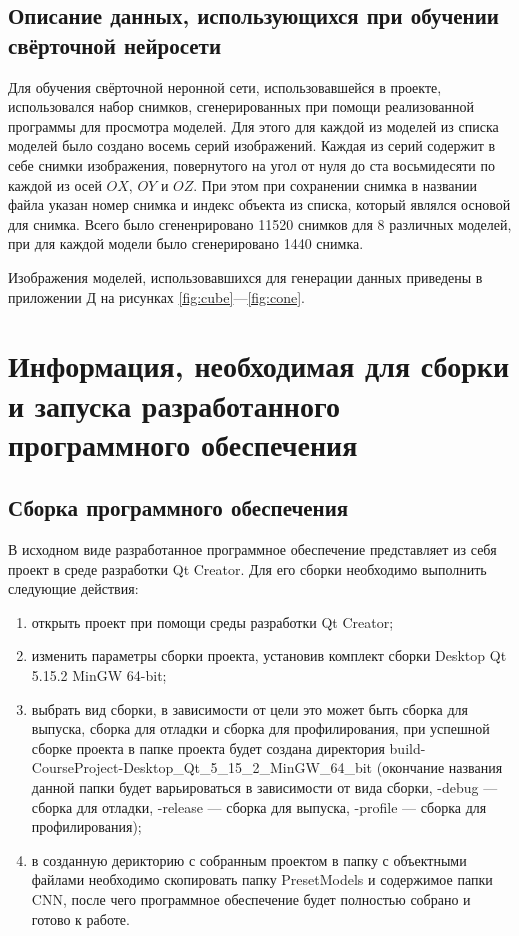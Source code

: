 \subsection{Описание данных, использующихся при обучении свёрточной нейросети}
Для обучения свёрточной неронной сети, использовавшейся в проекте, использовался набор снимков, сгенерированных при помощи реализованной программы для просмотра моделей. Для этого для каждой из моделей из списка моделей было создано восемь серий изображений. Каждая из серий содержит в себе снимки изображения, повернутого на угол от нуля до ста восьмидесяти по каждой из осей $OX$, $OY$ и $OZ$. При этом при сохранении снимка в названии файла указан номер снимка и индекс объекта из списка, который являлся основой для снимка. Всего было сгененрировано 11520 снимков для 8 различных моделей, при для каждой модели было сгенерировано 1440 снимка.

Изображения моделей, использовавшихся для генерации данных приведены в приложении Д на рисунках \ref{fig:cube}---\ref{fig:cone}.

\section{Информация, необходимая для сборки и запуска разработанного программного обеспечения}
\subsection{Сборка программного обеспечения}
В исходном виде разработанное программное обеспечение представляет из себя проект в среде разработки Qt Creator. Для его сборки необходимо выполнить следующие действия:
\begin{enumerate}
\item открыть проект при помощи среды разработки Qt Creator;
\item изменить параметры сборки проекта, установив комплект сборки Desktop Qt 5.15.2 MinGW 64-bit;
\item выбрать вид сборки, в зависимости от цели это может быть сборка для выпуска, сборка для отладки и сборка для профилирования, при успешной сборке проекта в папке проекта будет создана директория build-CourseProject-Desktop\_Qt\_5\_15\_2\_MinGW\_64\_bit (окончание названия данной папки будет варьироваться в зависимости от вида сборки, -debug --- сборка для отладки, -release --- сборка для выпуска, -profile --- сборка для профилирования);
\item в созданную дерикторию с собранным проектом в папку с объектными файлами необходимо скопировать папку PresetModels и содержимое папки CNN, после чего программное обеспечение будет полностью собрано и готово к работе.
\end{enumerate}
